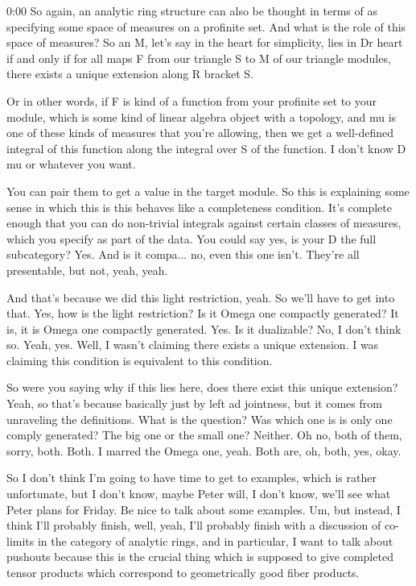 \begin{unfinished}{0:00}
So again, an analytic ring structure can also be thought in terms of as specifying some space of measures on a profinite set. And what is the role of this space of measures? So an M, let's say in the heart for simplicity, lies in Dr heart if and only if for all maps F from our triangle S to M of our triangle modules, there exists a unique extension along R bracket S. 

Or in other words, if F is kind of a function from your profinite set to your module, which is some kind of linear algebra object with a topology, and mu is one of these kinds of measures that you're allowing, then we get a well-defined integral of this function along the integral over S of the function. I don't know D mu or whatever you want. 

You can pair them to get a value in the target module. So this is explaining some sense in which this is this behaves like a completeness condition. It's complete enough that you can do non-trivial integrals against certain classes of measures, which you specify as part of the data. You could say yes, is your D the full subcategory? Yes. And is it compa... no, even this one isn't. They're all presentable, but not, yeah, yeah. 

And that's because we did this light restriction, yeah. So we'll have to get into that. Yes, how is the light restriction? Is it Omega one compactly generated? It is, it is Omega one compactly generated. Yes. Is it dualizable? No, I don't think so. Yeah, yes. Well, I wasn't claiming there exists a unique extension. I was claiming this condition is equivalent to this condition. 

So were you saying why if this lies here, does there exist this unique extension? Yeah, so that's because basically just by left ad jointness, but it comes from unraveling the definitions. What is the question? Was which one is is only one comply generated? The big one or the small one? Neither. Oh no, both of them, sorry, both. Both. I marred the Omega one, yeah. Both are, oh, both, yes, okay. 

So I don't think I'm going to have time to get to examples, which is rather unfortunate, but I don't know, maybe Peter will, I don't know, we'll see what Peter plans for Friday. Be nice to talk about some examples. Um, but instead, I think I'll probably finish, well, yeah, I'll probably finish with a discussion of co-limits in the category of analytic rings, and in particular, I want to talk about pushouts because this is the crucial thing which is supposed to give completed tensor products which correspond to geometrically good fiber products. 


\end{unfinished}
